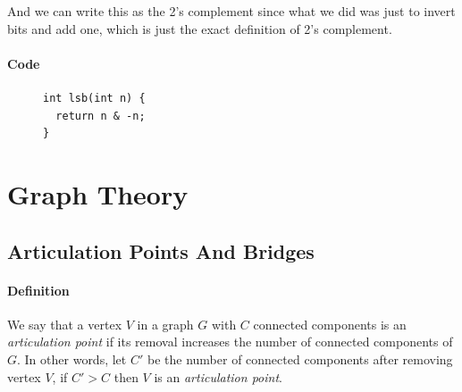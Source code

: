 \documentclass[twoside]{book}
\begin{document}
And we can write this as the 2's complement since what we did was just to invert bits and add one, which is just the exact definition of 2's complement.\\

\subsection*{Code}

\begin{figure}[thp]
  \centering
  \begin{minipage}[c]{0.9\textwidth}
    \begin{verbatim}
int lsb(int n) {
  return n & -n;
}
      \end{verbatim}
  \end{minipage}
\end{figure}

\egroup
\vspace{1em}
\begin{multicols*}{2}
\end{multicols*}
{
[\vspace{2em}]
\part*{Graph Theory}
}
{
\chapter*{Articulation Points And Bridges}
}
\vspace*{2em}
\subsection*{Definition}
We say that a vertex $V$ in a graph $G$ with $C$
connected components is an \textit{articulation point} if its removal increases the number of connected components of $G$.
In other words, let $C'$ be the number of connected components after removing vertex $V$, if $C' > C$ then $V$ is an \textit{articulation point}.
\end{document}

